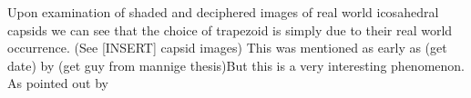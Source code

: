 \documentclass[12pt,letter]{article}
\begin{document}
Upon examination of shaded and deciphered images of real world icosahedral capsids we can see that the choice of trapezoid is simply due to their real world occurrence. (See [INSERT] capsid images) This was mentioned as early as (get date) by (get guy from mannige thesis)But this is a very interesting phenomenon. As pointed out by 





\end{document}
